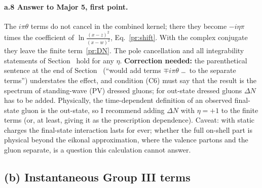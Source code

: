 \paragraph{a.8 Answer to Major 5, first point.} The $i\pi\theta$ terms do not cancel in the combined kernel; there they become $-i\eta\pi$ times the coefficient of $\ln\frac{(x-z)^2}{(x-w)^2}$, Eq.~\eqref{pr:shift}. With the complex conjugate they leave the finite term~\eqref{pr:DN}. The pole cancellation and all integrability statements of Section~ hold for any $\eta$. \textbf{Correction needed:} the parenthetical sentence at the end of Section~ (``would add terms $\mp i\pi\theta$ \dots\ to the separate terms'') understates the effect, and condition (C6) must say that the result is the spectrum of standing-wave (PV) dressed gluons; for out-state dressed gluons $\Delta N$ has to be added. Physically, the time-dependent definition of an observed final-state gluon is the out-state, so I recommend adding $\Delta N$ with $\eta=+1$ to the finite terms (or, at least, giving it as the prescription dependence). Caveat: with static charges the final-state interaction lasts for ever; whether the full on-shell part is physical beyond the eikonal approximation, where the valence partons and the gluon separate, is a question this calculation cannot answer.

\subsection{(b) Instantaneous Group III terms}\label{pr:b}

